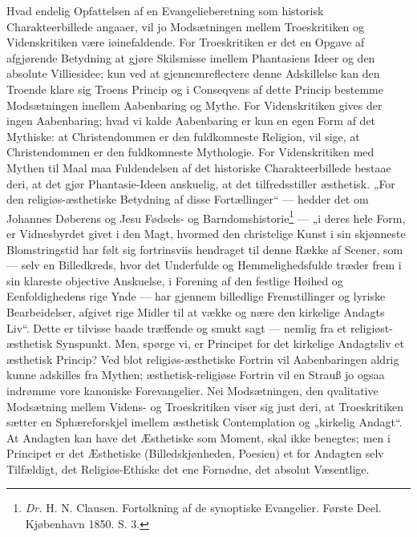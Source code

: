 \documentclass[12pt]{book}
\newcommand{\opage}[1]{\marginnote{\footnotesize\textit{[#1]}}}
\begin{document}
Hvad endelig Opfattelsen af en Evangelieberetning som
historisk Charakteerbillede angaaer, vil jo Modsætningen mellem
Troeskritiken og Videnskritiken være iøinefaldende. For
Troeskritiken er det en Opgave af afgjørende Betydning at
gjøre Skilsmisse imellem Phantasiens Ideer og den absolute
Villiesidee; kun ved at gjennemreflectere denne Adskillelse kan
den Troende klare sig Troens Princip og i Conseqvens af
\opage{61}\setcounter{footnote}{0}%
dette Princip bestemme Modsætningen imellem Aabenbaring
og Mythe. For Videnskritiken gives der ingen Aabenbaring;
hvad vi kalde Aabenbaring er kun en egen Form af det
Mythiske: at Christendommen er den fuldkomneste Religion,
vil sige, at Christendommen er den fuldkomneste Mythologie.
For Videnskritiken med Mythen til Maal maa Fuldendelsen
af det historiske Charakteerbillede bestaae deri, at det gjør
Phantasie-Ideen anskuelig, at det tilfredsstiller æsthetisk. „For
den religiøs-æsthetiske Betydning af disse Fortællinger“ ---
hedder det om %
Johannes Døberens og Jesu Fødsels- og
Barndomshistorie\footnote{\textit{Dr.} H. N. Clausen. Fortolkning af de synoptiske Evangelier.
Første Deel. Kjøbenhavn 1850. S. 3.%
}
--- „i deres hele Form, er Vidnesbyrdet
givet i den Magt, hvormed den christelige Kunst i sin skjønneste
Blomstringstid har følt sig fortrinsviis hendraget til
denne Række af Scener, som --- selv en Billedkreds, hvor
det Underfulde og Hemmelighedsfulde træder frem i sin
klareste objective Anskuelse, i Forening af den festlige Høihed
og Eenfoldighedens rige Ynde --- har gjennem billedlige
Fremstillinger og lyriske Bearbeidelser, afgivet rige Midler til
at vække og nære den kirkelige Andagts Liv“. Dette er
tilvisse baade træffende og smukt sagt --- nemlig fra et religiøst-æsthetisk
Synspunkt. Men, spørge vi, er Principet for
det kirkelige Andagtsliv et æsthetisk Princip? Ved blot religiøs-æsthetiske
Fortrin vil Aabenbaringen aldrig kunne adskilles
fra Mythen; æsthetisk-religiøse Fortrin vil en Strauß
jo ogsaa indrømme vore kanoniske Forevangelier. Nei Modsætningen,
den qvalitative Modsætning mellem Videns- og
Troeskritiken viser sig just deri, at Troeskritiken sætter en
Sphæreforskjel imellem æsthetisk Contemplation og „kirkelig
Andagt“. At Andagten kan have det Æsthetiske som Moment,
skal ikke benegtes; men i Principet er det Æsthetiske
\opage{62}\setcounter{footnote}{0}%
(Billedskjønheden, Poesien) et for Andagten selv Tilfældigt,
det Religiøs-Ethiske det ene Fornødne, det absolut Væsentlige.
\end{document}
